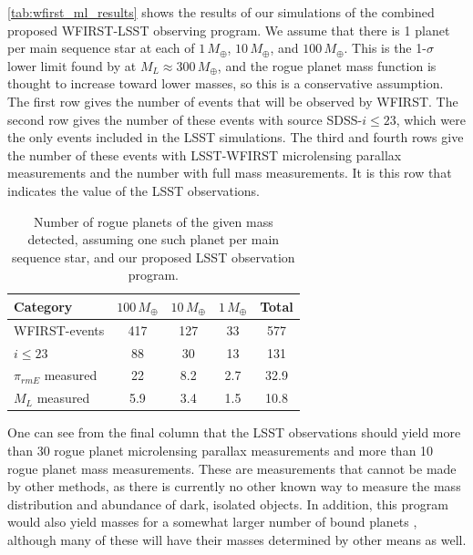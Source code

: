 \autoref{tab:wfirst_ml_results}
shows the results of our simulations of the combined proposed WFIRST-LSST
observing program. We assume that there is 1 planet per main sequence
star at each of $1\,M_\oplus$, $10\,M_\oplus$, and $100\,M_\oplus$.
This is the 1-$\sigma$ lower limit found by \citet{2011Natur.473..349S} at
$M_L \approx 300\,M_\oplus$, and the rogue planet mass function is
thought to increase toward lower masses, so this is a conservative
assumption. The first row gives the number of events that will be
observed by WFIRST. The second row gives the number of these events
with source SDSS-$i \leq 23$, which were the only events included in the
LSST simulations. The third and fourth rows give the number of these events
with LSST-WFIRST microlensing parallax measurements and the number
with full mass measurements. It is this row that indicates the
value of the LSST observations.

\begin{table}
\begin{tabular}{lcccc}
Category & $100\,M_\oplus$ & $10\,M_\oplus$ & $1\,M_\oplus$ & Total \\
\hline
WFIRST-events    &   417   &         127    &         33    &  577  \\
$i \leq 23$      &    88   &          30    &         13    &  131  \\
$\pi_{rm E}$ measured &    22   &           8.2  &          2.7  &   32.9 \\
$M_L$ measured   &    5.9  &           3.4  &          1.5  &   10.8 \\
\end{tabular}
\caption{Number of rogue planets of the given mass detected, assuming
one such planet per main sequence star, and our proposed LSST observation
program.}
\label{tab:wfirst_ml_results}
\end{table}

One can see from the final column that the LSST observations should
yield more than 30 rogue planet microlensing parallax measurements and
more than 10 rogue planet mass measurements.
%
These are measurements that cannot be made by other methods, as there is
currently no other known way to measure the mass distribution and abundance
of dark, isolated objects.
%
In addition, this program would
also yield masses for a somewhat larger number of bound planets
\citep{2003ApJ...591L..53G}, although many of these will have their
masses determined by other means as well.


